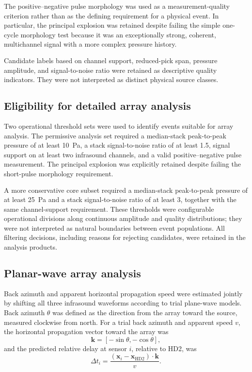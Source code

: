 \documentclass[]{seismica}
\begin{document}
The positive--negative pulse morphology was used as a measurement-quality criterion rather than as the defining requirement for a physical event. In particular, the principal explosion was retained despite failing the simple one-cycle morphology test because it was an exceptionally strong, coherent, multichannel signal with a more complex pressure history.

Candidate labels based on channel support, reduced-pick span, pressure amplitude, and signal-to-noise ratio were retained as descriptive quality indicators. They were not interpreted as distinct physical source classes.

\subsection{Eligibility for detailed array analysis}

Two operational threshold sets were used to identify events suitable for array analysis. The permissive analysis set required a median-stack peak-to-peak pressure of at least 10~Pa, a stack signal-to-noise ratio of at least 1.5, signal support on at least two infrasound channels, and a valid positive--negative pulse measurement. The principal explosion was explicitly retained despite failing the short-pulse morphology requirement.

A more conservative core subset required a median-stack peak-to-peak pressure of at least 25~Pa and a stack signal-to-noise ratio of at least 3, together with the same channel-support requirement. These thresholds were configurable operational divisions along continuous amplitude and quality distributions; they were not interpreted as natural boundaries between event populations. All filtering decisions, including reasons for rejecting candidates, were retained in the analysis products.

\subsection{Planar-wave array analysis}

Back azimuth and apparent horizontal propagation speed were estimated jointly by shifting all three infrasound waveforms according to trial plane-wave models. Back azimuth $\theta$ was defined as the direction from the array toward the source, measured clockwise from north. For a trial back azimuth and apparent speed $v$, the horizontal propagation vector toward the array was
\begin{equation}
  \mathbf{k} = [-\sin\theta,-\cos\theta],
  \label{eq:propagation_vector}
\end{equation}
and the predicted relative delay at sensor $i$, relative to HD2, was
\begin{equation}
  \Delta t_i = \frac{(\mathbf{x}_i-\mathbf{x}_{\mathrm{HD2}})\cdot\mathbf{k}}{v}.
  \label{eq:plane_delay}
\end{equation}
\end{document}
